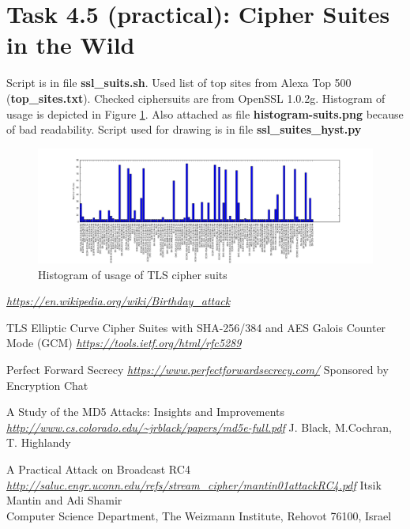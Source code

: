 \documentclass{article}
\begin{document}
\section*{Task 4.5 (practical): Cipher Suites in the Wild}
Script is in file \textbf{ssl\_suits.sh}. Used list of top sites from Alexa Top 500 (\textbf{top\_sites.txt}). Checked ciphersuits are from OpenSSL 1.0.2g. Histogram of usage is depicted in Figure \ref{fig:hist}. Also attached as file \textbf{histogram-suits.png} because of bad readability. Script used for drawing is in file \textbf{ssl\_suites\_hyst.py}

\begin{figure}[h]
    \centering
    \includegraphics[width=\textwidth]{histogram-suits.png}
    \caption{Histogram of usage of TLS cipher suits}
    \label{fig:hist}
\end{figure}

\begin{thebibliography}{9}

\emph{\url{https://en.wikipedia.org/wiki/Birthday_attack}}

  TLS Elliptic Curve Cipher Suites with SHA-256/384 and AES Galois Counter Mode (GCM)
  \emph{\url{https://tools.ietf.org/html/rfc5289}}
  
  Perfect Forward Secrecy
  \emph{\url{https://www.perfectforwardsecrecy.com/}}
  Sponsored by Encryption Chat

  A Study of the MD5 Attacks: Insights and Improvements
  \emph{\url{http://www.cs.colorado.edu/~jrblack/papers/md5e-full.pdf}}
  J. Black, M.Cochran, T. Highlandy
  
  A Practical Attack on Broadcast RC4
  \emph{\url{http://saluc.engr.uconn.edu/refs/stream_cipher/mantin01attackRC4.pdf}}
  Itsik Mantin and Adi Shamir\\
  Computer Science Department, The Weizmann Institute, Rehovot 76100, Israel

  
\end{thebibliography}
\end{document}
